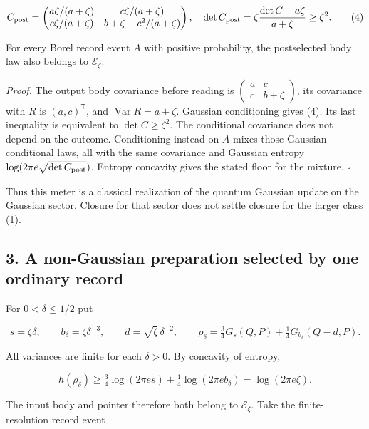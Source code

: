 \documentclass[11pt,a4paper]{article}
\begin{document}
\[
 C_{\rm post}=\begin{pmatrix}
 a\zeta/(a+\zeta)&c\zeta/(a+\zeta)\\
 c\zeta/(a+\zeta)&b+\zeta-c^2/(a+\zeta)
 \end{pmatrix},\quad
 \det C_{\rm post}=\zeta\frac{\det C+a\zeta}{a+\zeta}\ge\zeta^2. \tag{4}
\]

For every Borel record event \(A\) with positive probability, the
postselected body law also belongs to \(\mathcal E_\zeta\).

\emph{Proof.} The output body covariance before reading is
\(\begin{pmatrix}a&c\\c&b+\zeta\end{pmatrix}\), its covariance with
\(R\) is \((a,c)^{\mathsf T}\), and \(\operatorname{Var}R=a+\zeta\).
Gaussian conditioning gives (4). Its last inequality is equivalent to
\(\det C\ge\zeta^2\). The conditional covariance does not depend on the
outcome. Conditioning instead on \(A\) mixes those Gaussian conditional
laws, all with the same covariance and Gaussian entropy
\(\log(2\pi e\sqrt{\det C_{\rm post}})\). Entropy concavity gives the
stated floor for the mixture. \(\square\)

Thus this meter is a classical realization of the quantum Gaussian
update on the Gaussian sector. Closure for that sector does not settle
closure for the larger class (1).

\hypertarget{a-non-gaussian-preparation-selected-by-one-ordinary-record}{%
\subsection{3. A non-Gaussian preparation selected by one ordinary
record}\label{a-non-gaussian-preparation-selected-by-one-ordinary-record}}

For \(0<\delta\le1/2\) put

\[
 s=\zeta\delta,\qquad b_\delta=\zeta\delta^{-3},\qquad
 d=\sqrt\zeta\,\delta^{-2},\qquad
 \rho_\delta=\tfrac34G_s(Q,P)+\tfrac14G_{b_\delta}(Q-d,P). \tag{5}
\]

All variances are finite for each \(\delta>0\). By concavity of entropy,

\[
 h(\rho_\delta)\ge\tfrac34\log(2\pi e s)
                   +\tfrac14\log(2\pi e b_\delta)
                 =\log(2\pi e\zeta). \tag{6}
\]

The input body and pointer therefore both belong to
\(\mathcal E_\zeta\). Take the finite-resolution record event
\end{document}
